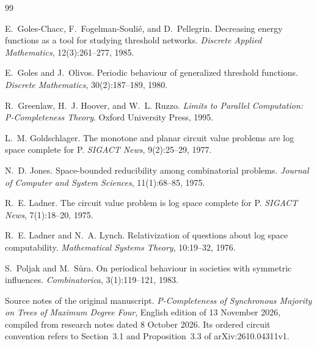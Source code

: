 \documentclass[11pt]{article}
\begin{document}
\begin{thebibliography}{99}\small

E.~Goles-Chacc, F.~Fogelman-Souli\'e, and D.~Pellegrin.
\newblock Decreasing energy functions as a tool for studying threshold networks.
\newblock \emph{Discrete Applied Mathematics}, 12(3):261--277, 1985.

E.~Goles and J.~Olivos.
\newblock Periodic behaviour of generalized threshold functions.
\newblock \emph{Discrete Mathematics}, 30(2):187--189, 1980.

R.~Greenlaw, H.~J. Hoover, and W.~L. Ruzzo.
\newblock \emph{Limits to Parallel Computation: {P}-Completeness Theory}.
\newblock Oxford University Press, 1995.

L.~M. Goldschlager.
\newblock The monotone and planar circuit value problems are log space complete for {P}.
\newblock \emph{SIGACT News}, 9(2):25--29, 1977.

N.~D. Jones.
\newblock Space-bounded reducibility among combinatorial problems.
\newblock \emph{Journal of Computer and System Sciences}, 11(1):68--85, 1975.

R.~E. Ladner.
\newblock The circuit value problem is log space complete for {P}.
\newblock \emph{SIGACT News}, 7(1):18--20, 1975.

R.~E. Ladner and N.~A. Lynch.
\newblock Relativization of questions about log space computability.
\newblock \emph{Mathematical Systems Theory}, 10:19--32, 1976.

S.~Poljak and M.~S\r{u}ra.
\newblock On periodical behaviour in societies with symmetric influences.
\newblock \emph{Combinatorica}, 3(1):119--121, 1983.

Source notes of the original manuscript.
\newblock \emph{P-Completeness of Synchronous Majority on Trees of Maximum Degree Four}, English
edition of 13 November 2026, compiled from research notes dated 8 October 2026. Its ordered circuit
convention refers to Section~3.1 and Proposition~3.3 of arXiv:2610.04311v1.

\end{thebibliography}
\end{document}
